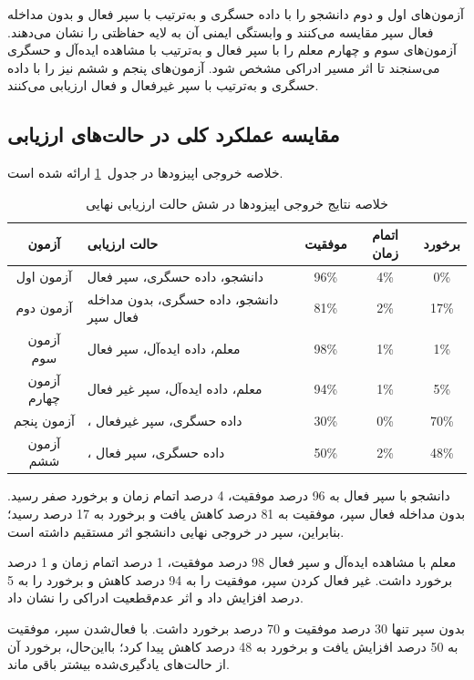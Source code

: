 آزمون‌های اول و دوم دانشجو را با داده حسگری و به‌ترتیب با سپر فعال و بدون مداخله فعال سپر مقایسه می‌کنند و وابستگی ایمنی آن به لایه حفاظتی را نشان می‌دهند. آزمون‌های سوم و چهارم معلم را با سپر فعال و به‌ترتیب با مشاهده ایده‌آل و حسگری می‌سنجند تا اثر مسیر ادراکی مشخص شود. آزمون‌های پنجم و ششم نیز  را با داده حسگری و به‌ترتیب با سپر غیرفعال و فعال ارزیابی می‌کنند.

\subsection{مقایسه عملکرد کلی در حالت‌های ارزیابی}
\label{subsec:final_eval_overall_comparison}

خلاصه خروجی اپیزودها در جدول~\ref{tab:final_eval_outcome_summary} ارائه شده است.

\begin{table}[htbp]
	\centering
	\caption{خلاصه نتایج خروجی اپیزودها در شش حالت ارزیابی نهایی}
	\label{tab:final_eval_outcome_summary}
	\small
	\begin{tabular}{c p{6.8cm} c c c}
		\hline
		آزمون & حالت ارزیابی & موفقیت & اتمام زمان & برخورد \\
		\hline
		آزمون اول & دانشجو، داده حسگری، سپر فعال & 96\% & 4\% & 0\% \\
		آزمون دوم & دانشجو، داده حسگری، بدون مداخله فعال سپر & 81\% & 2\% & 17\% \\
		آزمون سوم & معلم، داده ایده‌آل، سپر فعال & 98\% & 1\% & 1\% \\
		آزمون چهارم & معلم، داده ایده‌آل، سپر غیر فعال & 94\% & 1\% & 5\% \\
		آزمون پنجم & \lr{MPC}، داده حسگری، سپر غیرفعال & 30\% & 0\% & 70\% \\
		آزمون ششم & \lr{MPC}، داده حسگری، سپر فعال & 50\% & 2\% & 48\% \\
		\hline
	\end{tabular}
\end{table}

دانشجو با سپر فعال به 96 درصد موفقیت، 4 درصد اتمام زمان و برخورد صفر رسید. بدون مداخله فعال سپر، موفقیت به 81 درصد کاهش یافت و برخورد به 17 درصد رسید؛ بنابراین، سپر در خروجی نهایی دانشجو اثر مستقیم داشته است.

معلم با مشاهده ایده‌آل و سپر فعال 98 درصد موفقیت، 1 درصد اتمام زمان و 1 درصد برخورد داشت. غیر فعال کردن سپر، موفقیت را به 94 درصد کاهش و برخورد را به 5 درصد افزایش داد و اثر عدم‌قطعیت ادراکی را نشان داد.

 بدون سپر تنها 30 درصد موفقیت و 70 درصد برخورد داشت. با فعال‌شدن سپر، موفقیت به 50 درصد افزایش یافت و برخورد به 48 درصد کاهش پیدا کرد؛ بااین‌حال، برخورد آن از حالت‌های یادگیری‌شده بیشتر باقی ماند.

